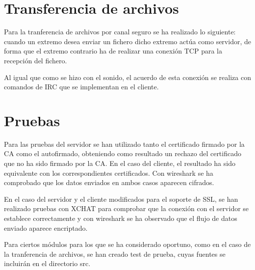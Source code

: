\documentclass{mathnotes}
\begin{document}
\section{Transferencia de archivos}
Para la tranferencia de archivos por canal seguro se ha realizado lo siguiente: cuando un extremo desea enviar un fichero dicho extremo actúa como servidor, de forma que el extremo contrario ha de realizar una conexión TCP para la recepción del fichero.

Al igual que como se hizo con el sonido, el acuerdo de esta conexión se realiza con comandos de IRC que se implementan en el cliente.

\section{Pruebas}
Para las pruebas del servidor se han utilizado tanto el certificado firmado por la CA como el autofirmado, obteniendo como resultado un rechazo del certificado que no ha sido firmado por la CA. En el caso del cliente, el resultado ha sido equivalente con los correspondientes certificados.
Con wireshark se ha comprobado que los datos enviados en ambos casos aparecen cifrados.

En el caso del servidor y el cliente modificados para el soporte de SSL, se han realizado pruebas con XCHAT para comprobar que la conexión con el servidor se establece correctamente y con wireshark se ha observado que el flujo de datos enviado aparece encriptado.

Para ciertos módulos para los que se ha considerado oportuno, como en el caso de la tranferencia de archivos, se han creado test de prueba, cuyas fuentes se incluirán en el directorio src.
\end{document}
